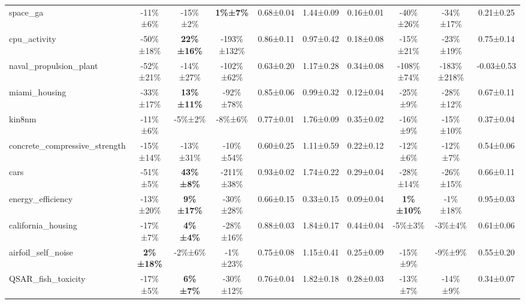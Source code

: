 \begin{table}[!htbp]
\begin{small}
\begin{sc}
{\begin{tabular}{lccccccccc}
space\_ga & -11\%±6\% & -15\%±2\% & \textbf{1\%±7\%} & 0.68±0.04 & 1.44±0.09 & 0.16±0.01 & -40\%±26\% & -34\%±17\% & 0.21±0.25 \\
cpu\_activity & -50\%±18\% & \textbf{22\%±16\%} & -193\%±132\% & 0.86±0.11 & 0.97±0.42 & 0.18±0.08 & -15\%±21\% & -23\%±19\% & 0.75±0.14 \\
naval\_propulsion\_plant & -52\%±21\% & -14\%±27\% & -102\%±62\% & 0.63±0.20 & 1.17±0.28 & 0.34±0.08 & -108\%±74\% & -183\%±218\% & -0.03±0.53 \\
miami\_housing & -33\%±17\% & \textbf{13\%±11\%} & -92\%±78\% & 0.85±0.06 & 0.99±0.32 & 0.12±0.04 & -25\%±9\% & -28\%±12\% & 0.67±0.11 \\
kin8nm & -11\%±6\% & -5\%±2\% & -8\%±6\% & 0.77±0.01 & 1.76±0.09 & 0.35±0.02 & -16\%±9\% & -15\%±10\% & 0.37±0.04 \\
concrete\_compressive\_strength & -15\%±14\% & -13\%±31\% & -10\%±54\% & 0.60±0.25 & 1.11±0.59 & 0.22±0.12 & -12\%±6\% & -12\%±7\% & 0.54±0.06 \\
cars & -51\%±5\% & \textbf{43\%±8\%} & -211\%±38\% & 0.93±0.02 & 1.74±0.22 & 0.29±0.04 & -28\%±14\% & -26\%±15\% & 0.66±0.11 \\
energy\_efficiency & -13\%±20\% & \textbf{9\%±17\%} & -30\%±28\% & 0.66±0.15 & 0.33±0.15 & 0.09±0.04 & \textbf{1\%±10\%} & -1\%±18\% & 0.95±0.03 \\
california\_housing & -17\%±7\% & \textbf{4\%±4\%} & -28\%±16\% & 0.88±0.03 & 1.84±0.17 & 0.44±0.04 & -5\%±3\% & -3\%±4\% & 0.61±0.06 \\
airfoil\_self\_noise & \textbf{2\%±18\%} & -2\%±6\% & -1\%±23\% & 0.75±0.08 & 1.15±0.41 & 0.25±0.09 & -15\%±9\% & -9\%±9\% & 0.55±0.20 \\
QSAR\_fish\_toxicity & -17\%±5\% & \textbf{6\%±7\%} & -30\%±12\% & 0.76±0.04 & 1.82±0.18 & 0.28±0.03 & -13\%±7\% & -14\%±9\% & 0.34±0.07 \\

\bottomrule
\end{tabular}
}
\end{sc}
\end{small}
\end{table}
